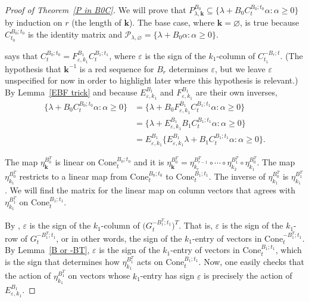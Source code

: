 \documentclass[10pt]{article}
\theoremstyle{definition}
\theoremstyle{remark}
\numberwithin{equation}{section}
\newcommand{\ep}{\varepsilon}
\newcommand{\set}[1]{{\lbrace #1 \rbrace}}
\renewcommand{\th}{^\text{th}}
\newcommand{\0}{{\mathbf{0}}}
\newcommand{\Cone}{\mathrm{Cone}}
\newcommand{\kk}{{\boldsymbol{k}}}
\renewcommand{\P}{\mathcal{P}}
\renewcommand{\th}{^\text{th}}
\begin{document}
\begin{proof}[Proof of Theorem~\ref{P in B0C}]
We will prove that $P^{B_0}_{\lambda,\kk}\subseteq\set{\lambda+B_0C_t^{B_0;t_0}\alpha:\alpha\ge0}$ by induction on $r$ (the length of $\kk$).
The base case, where $\kk=\varnothing$, is true because~$C_{t_0}^{B_0;t_0}$ is the identity matrix and $\P_{\lambda,\varnothing}=\set{\lambda+B_0\alpha:\alpha\ge0}$.
 
\cite[Proposition~1.4]{NZ} says that $C_t^{B_0;t_0}=F^{B_1}_{\ep,k_1}C_t^{B_1;t_1}$, where $\ep$ is the sign of the $k_1$-column of $C_{t_1}^{-B_r;t}$.  
(The hypothesis that $\kk^{-1}$ is a red sequence for $B_r$ determines $\ep$, but we leave $\ep$ unspecified for now in order to highlight later where this hypothesis is relevant.)
By Lemma~\ref{EBF trick} and because $E^{B_1}_{\ep,k_1}$ and $F^{B_1}_{\ep,k_1}$ are their own inverses,
\begin{equation}\label{ind B0C}\begin{aligned}
\set{\lambda+B_0C_t^{B_0;t_0}\alpha:\alpha\ge0}
&=\set{\lambda+B_0F^{B_1}_{\ep,k_1}C_t^{B_1;t_1}\alpha:\alpha\ge0}\\
&=\set{\lambda+E^{B_1}_{\ep,k_1}B_1C_t^{B_1;t_1}\alpha:\alpha\ge0}\\
&=E^{B_1}_{\ep,k_1}\set{E^{B_1}_{\ep,k_1}\lambda+B_1C_t^{B_1;t_1}\alpha:\alpha\ge0}.
\end{aligned}\end{equation}

The map $\eta_{\kk}^{B_0^T}$ is linear on $\Cone_t^{B_0;t_0}$ and it is $\eta_{\kk}^{B_0^T}={\eta_{k_r}^{B_{r-1}^T}\circ\cdots\circ\eta_{k_2}^{B_1^T}\circ\eta_{k_1}^{B_0^T}}$.
The map $\eta_{k_1}^{B_0^T}$ restricts to a linear map from $\Cone_t^{B_0;t_0}$ to $\Cone_t^{B_1;t_1}$.
The inverse of $\eta_{k_1}^{B_0^T}$ is $\eta_{k_1}^{B_1^T}$.
We will find the matrix for the linear map on column vectors that agrees with $\eta_{k_1}^{B_1^T}$ on $\Cone_t^{B_1;t_1}$.

By \cite[(1.13)]{NZ}, $\ep$ is the sign of the $k_1$-column of $\bigl(G_t^{-B_1^T;t_1}\bigr)^T$.
That is, $\ep$ is the sign of the $k_1$-row of $G_t^{-B_1^T;t_1}$, or in other words, the sign of the $k_1$-entry of vectors in $\Cone_t^{-B^T_1;t_1}$.
By Lemma~\ref{B or -BT}, $\ep$ is the sign of the $k_1$-entry of vectors in $\Cone_t^{B_1;t_1}$, which is the sign that determines how $\eta_{k_1}^{B_1^T}$ acts on $\Cone_t^{B_1;t_1}$.
Now, one easily checks that the action of $\eta_{k_1}^{B_1^T}$ on vectors whose $k_1$-entry has sign $\ep$ is precisely the action of $E^{B_1}_{\ep,k_1}$.


\end{proof}
\end{document}
